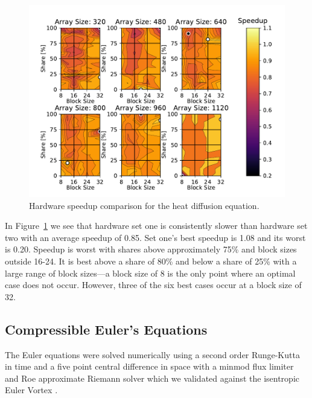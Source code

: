 \documentclass[preprints,article,accept,moreauthors,pdftex]{Definitions/mdpi}
\newcommand\fs{0.7}
\begin{document}
\begin{figure}[H]
    
    \begin{center}
        \includegraphics[scale=\fs, trim={0.75cm 0.4cm 0.8cm 0.7cm},clip]{figs/hardwareSpeedupheat.pdf}
        \caption{Hardware speedup comparison for the heat diffusion equation.}
        \label{fig:heatHardwareComp}
    \end{center}
\end{figure}




In Figure~\ref{fig:heatHardwareComp} we see that hardware set one is consistently slower than hardware set two with an average speedup of 0.85. Set one's best speedup is 1.08 and its worst is 0.20. Speedup is worst with shares above approximately 75\% and block sizes outside 16-24. It is best above a share of 80\% and below a share of 25\% with a large range of block sizes---a block size of 8 is the only point where an optimal case does not occur. However, three of the six best cases occur at a block size of 32.

\subsection{Compressible Euler's Equations}
\label{eulerVortexResults}
The Euler equations were solved numerically using a second order Runge-Kutta in time and a five point central difference in space with a minmod flux limiter and Roe approximate Riemann solver which we validated against the isentropic Euler Vortex \cite{SpiegelAMethods}.
\end{document}
